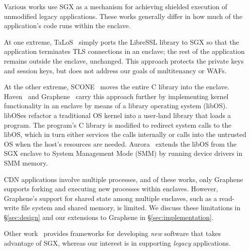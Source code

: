 %
Various works use SGX as a mechanism for achieving shielded execution of
unmodified legacy applications.
%
These works generally differ in how much of the application's code runs
within the enclave.


At one extreme, TaLoS~\cite{talos} simply ports the LibreSSL library to SGX so
that the application terminates TLS connections in an enclave; the rest of
the application remains outside the enclave, unchanged.
%
This approach protects the private keys and session
keys, but does not address our goals of multitenancy or WAFs.


At the other extreme, SCONE~\cite{scone} moves the entire C library into the enclave.
%
Haven~\cite{haven} and Graphene~\cite{graphene} carry this approach further by
implementing kernel functionality in an enclave by means of a library operating
system (libOS).
libOSes refactor a traditional OS kernel into a user-land library that loads a
program.
%
The program's C library is modified to redirect system calls to the libOS, which
in turn either services the calls internally or calls into the untrusted OS
when the host's resources are needed.
%
Aurora~\cite{liang2018aurora} extends the libOS from the SGX enclave to System
Management Mode (SMM) by running device drivers in SMM memory.


CDN applications involve multiple processes, and of these works, only Graphene
supports forking and executing new processes within enclaves.
%
However, Graphene's support for shared state among multiple enclaves, such as a
read-write file system and shared memory, is limited.
%
We discuss these limitations in \S\ref{sec:design} and our extensions to
Graphene in \S\ref{sec:implementation}.


Other work~\cite{beekman2016improving} provides
frameworks for developing \emph{new} software that takes advantage of SGX,
whereas our interest is in supporting \emph{legacy} applications.




